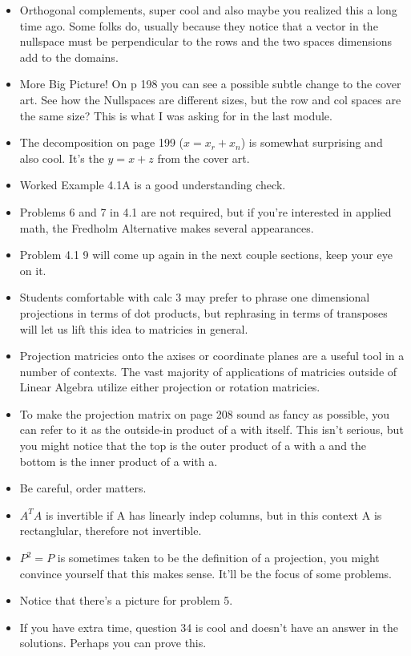 		\begin{itemize}
			\item Orthogonal complements, super cool and also maybe you realized this a long time ago. Some folks do, usually because they notice that a vector in the nullspace must be perpendicular to the rows and the two spaces dimensions add to the domains.
			\item More Big Picture! On p 198 you can see a possible subtle change to the cover art. See how the Nullspaces are different sizes, but the row and col spaces are the same size? This is what I was asking for in the last module.
			\item The decomposition on page 199 ($x = x_r + x_n$) is somewhat surprising and also cool. It's the $y = x+z$ from the cover art.
			\item Worked Example 4.1A is a good understanding check.
			\item Problems 6 and 7 in 4.1 are not required, but if you're interested in applied math, the Fredholm Alternative makes several appearances.
			\item Problem 4.1 9 will come up again in the next couple sections, keep your eye on it.
			\item Students comfortable with calc 3 may prefer to phrase one dimensional projections in terms of dot products, but rephrasing in terms of transposes will let us lift this idea to matricies in general.
			\item Projection matricies onto the axises or coordinate planes are a useful tool in a number of contexts. The vast majority of applications of matricies outside of Linear Algebra utilize either projection or rotation matricies.
			\item To make the projection matrix on page 208 sound as fancy as possible, you can refer to it as the outside-in product of a with itself. This isn't serious, but you might notice that the top is the outer product of a with a and the bottom is the inner product of a with a.
			\item Be careful, order matters.
			\item $A^TA$ is invertible if A has linearly indep columns, but in this context A is rectanglular, therefore not invertible.
			\item $P^2 = P$ is sometimes taken to be the definition of a projection, you might convince yourself that this makes sense. It'll be the focus of some problems.
			\item Notice that there's a picture for problem 5.
			\item If you have extra time, question 34 is cool and doesn't have an answer in the solutions. Perhaps you can prove this.
		\end{itemize}

